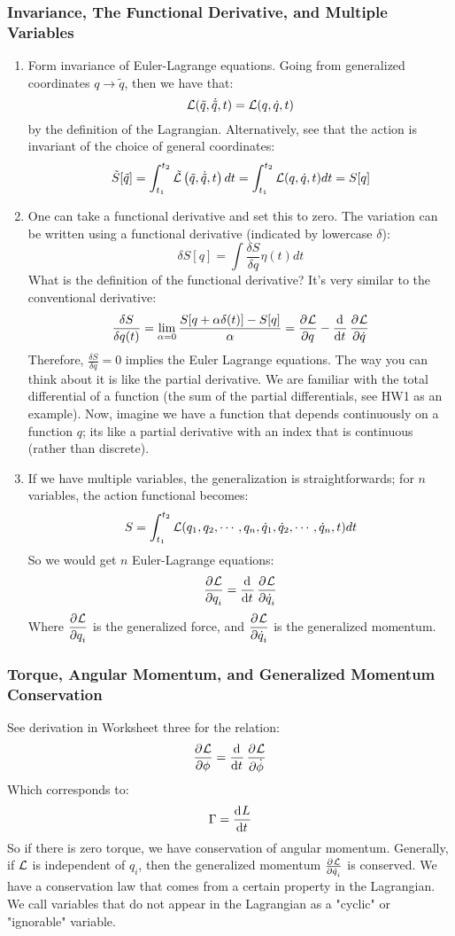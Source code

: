 \documentclass[../PHYS306Notes.tex]{subfiles}
\begin{document}
\subsubsection{Invariance, The Functional Derivative, and Multiple Variables}
\begin{enumerate}
    \item Form invariance of Euler-Lagrange equations. Going from generalized coordinates $q \rightarrow \tilde{q}$, then we have that:
    \[\mathcal{L}(\tilde{q}, \dot{\tilde{q}}, t) = \mathcal{L}(q, \dot{q}, t)\]
    by the definition of the Lagrangian. Alternatively, see that the action is invariant of the choice of general coordinates:
    \[\tilde{S}[\tilde{q}] = \int_{t_{1}}^{t_2} \tilde{\mathcal{L}}\left(\tilde{q}, \dot{\tilde{q}}, t\right) d t=\int_{t_{1}}^{t_2} \mathcal{L}(q, \dot{q}, t) d t=S[q]\]
    \item One can take a functional derivative and set this to zero. The variation can be written using a functional derivative (indicated by lowercase $\delta$):
    \[\delta S[q] = \int \frac{\delta S}{\delta q} \eta(t) dt\]
    What is the definition of the functional derivative? It's very similar to the conventional derivative:
    \[\frac{\delta S}{\delta q(t)} = \lim_{\alpha = 0} \frac{S[q + \alpha \delta(t)] - S[q]}{\alpha} = \dpd{\LL}{q} - \dod{}{t}\dpd{\LL}{\dot{q}}\]
    Therefore, $\frac{\delta S}{\delta q} = 0$ implies the Euler Lagrange equations. The way you can think about it is like the partial derivative. We are familiar with the total differential of a function (the sum of the partial differentials, see HW1 as an example). Now, imagine we have a function that depends continuously on a function $q$; its like a partial derivative with an index that is continuous (rather than discrete). 
    \item If we have multiple variables, the generalization is straightforwards; for $n$ variables, the action functional becomes:
    \[S = \int_{t_1}^{t_2}\mathcal{L}(q_1, q_2, \cdots, q_n, \dot{q}_1, \dot{q}_2, \cdots, \dot{q}_n, t)dt\]
    So we would get $n$ Euler-Lagrange equations:
    \[\dpd{\LL}{q_i} = \dod{}{t}\dpd{\LL}{\dot{q}_i}\]
    Where $\dpd{\LL}{q_i}$ is  the generalized force, and $\dpd{\LL}{\dot{q}_i}$ is the generalized momentum. 
\end{enumerate}

\subsubsection{Torque, Angular Momentum, and Generalized Momentum Conservation}
See derivation in Worksheet three for the relation:
\[\dpd{\LL}{\phi} = \dod{}{t}\dpd{\LL}{\dot{\phi}}\]
Which corresponds to:
\[\Gamma = \dod{L}{t}\]
So if there is zero torque, we have conservation of angular momentum. Generally, if $\mathcal{L}$ is independent of $q_i$, then the generalized momentum $\pd{\LL}{\dot{q}_i}$ is conserved. We have a conservation law that comes from a certain property in the Lagrangian. We call variables that do not appear in the Lagrangian as a "cyclic" or "ignorable" variable.
\end{document}
